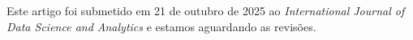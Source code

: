 Este artigo foi submetido em 21 de outubro de 2025 ao \textit{International Journal of Data Science and Analytics} e estamos aguardando as revisões.


